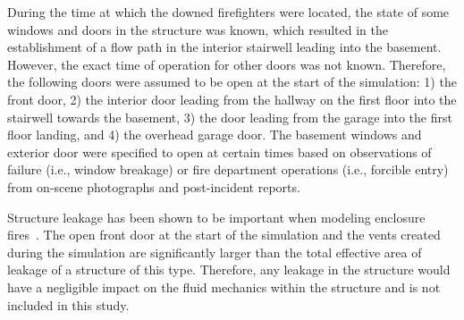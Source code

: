 \documentclass[12pt,oneside]{book}
\begin{document}
During the time at which the downed firefighters were located, the state of some windows and doors in the structure was known, which resulted in the establishment of a flow path in the interior stairwell leading into the basement. However, the exact time of operation for other doors was not known. Therefore, the following doors were assumed to be open at the start of the simulation: 1) the front door, 2) the interior door leading from the hallway on the first floor into the stairwell towards the basement, 3) the door leading from the garage into the first floor landing, and 4) the overhead garage door. The basement windows and exterior door were specified to open at certain times based on observations of failure (i.e., window breakage) or fire department operations (i.e., forcible entry) from on-scene photographs and post-incident reports.

Structure leakage has been shown to be important when modeling enclosure fires~\cite{beal2009}. The open front door at the start of the simulation and the vents created during the simulation are significantly larger than the total effective area of leakage of a structure of this type. Therefore, any leakage in the structure would have a negligible impact on the fluid mechanics within the structure and is not included in this study.
\end{document}
